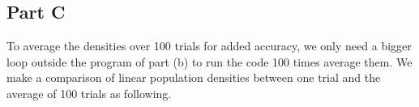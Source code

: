 \documentclass{article}
\begin{document}
\begin{figure}[!ht]
	\centering
\end{figure}
\clearpage
\subsection{Part C}
\quad To average the densities over 100 trials for added accuracy, we only need a bigger loop outside the program of part (b) to run the code 100 times average them. We make a comparison of linear population densities between one trial and the average of 100 trials as following.
\begin{figure}[!ht]
	\centering
\end{figure}
\end{document}
